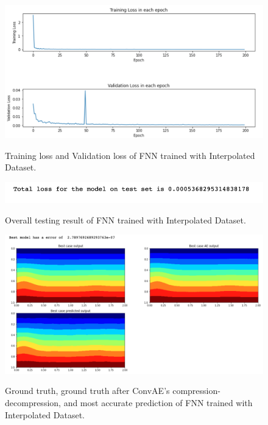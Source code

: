 \begin{figure}[H]
    \caption{Training loss and Validation loss of FNN trained with Interpolated Dataset.}
    \includegraphics[scale=0.6]{figures/mantle_convection_images/larger_dataset_interpolated/FNN_trainingData.png}
    \label{figure:FNN_interpolated_losses}
\end{figure}

\begin{figure}[H]
    \caption{Overall testing result of FNN trained with Interpolated Dataset.}
    \includegraphics[scale=0.8]{figures/mantle_convection_images/larger_dataset_interpolated/FNN_OverallTesting.png}
    \label{figure:FNN_interpolated_testing}
\end{figure}

\begin{figure}[H]
    \caption{Ground truth, ground truth after ConvAE's compression-decompression, and most accurate prediction of FNN trained with Interpolated Dataset.}
    \includegraphics[scale=0.5]{figures/mantle_convection_images/larger_dataset_interpolated/FNN_Best.png}
    \label{figure:FNN_interpolated_best}
\end{figure}


